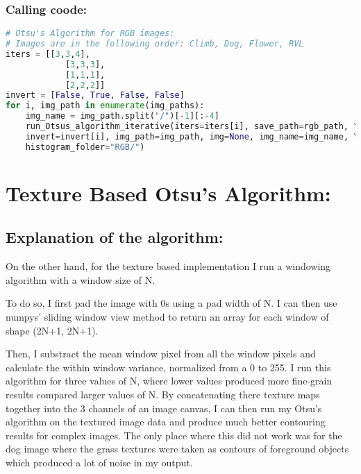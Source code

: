 \documentclass{article}
\begin{document}
\subsubsection{Calling coode:}
\begin{lstlisting}[language=Python]
# Otsu's Algorithm for RGB images:
# Images are in the following order: Climb, Dog, Flower, RVL
iters = [[3,3,4], 
            [3,3,3], 
            [1,1,1],
            [2,2,2]]
invert = [False, True, False, False]
for i, img_path in enumerate(img_paths):
    img_name = img_path.split("/")[-1][:-4]
    run_Otsus_algorithm_iterative(iters=iters[i], save_path=rgb_path, \
    invert=invert[i], img_path=img_path, img=None, img_name=img_name, \
    histogram_folder="RGB/")    
\end{lstlisting}

\section{Texture Based Otsu's Algorithm:}
\subsection{Explanation of the algorithm:}
On the other hand, for the texture based implementation I run a windowing algorithm with a window size of N.

To do so, I first pad the image with 0s using a pad width of N. I can then use numpys' sliding window view method to
return an array for each window of shape (2N+1, 2N+1). 

Then, I substract the mean window pixel from all the window pixels and calculate the within window variance, normalized
from a 0 to 255. I run this algorithm for three values of N, where lower values produced more fine-grain results compared
larger values of N. By concatenating there texture maps together into the 3 channels of an image canvas, I can then run my
Otsu's algorithm on the textured image data and produce much better contouring results for complex images. The only place
where this did not work was for the dog image where the grass textures were taken as contours of foreground objects which
produced a lot of noise in my output.
\end{document}
